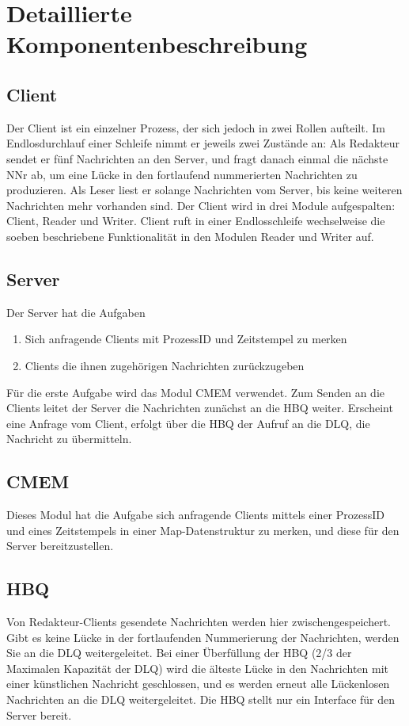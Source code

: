 \documentclass{scrreprt}
\begin{document}
\chapter{Detaillierte Komponentenbeschreibung}

\section{Client}
Der Client ist ein einzelner Prozess, der sich jedoch in zwei Rollen aufteilt. Im Endlosdurchlauf einer Schleife nimmt er jeweils zwei Zustände an: 
    Als Redakteur sendet er fünf Nachrichten an den Server, und fragt danach einmal die nächste NNr ab, um eine Lücke in den fortlaufend nummerierten Nachrichten zu produzieren.
    Als Leser liest er solange Nachrichten vom Server, bis keine weiteren Nachrichten mehr vorhanden sind.
    \newline
Der Client wird in drei Module aufgespalten: Client, Reader und Writer. Client ruft in einer Endlosschleife wechselweise die soeben beschriebene Funktionalität in den Modulen Reader und Writer auf.

\section{Server}
Der Server hat die Aufgaben  
\begin{enumerate}
    \item{Sich anfragende Clients mit ProzessID und Zeitstempel zu merken}
    \item{Clients die ihnen zugehörigen Nachrichten zurückzugeben}
\end{enumerate}
Für die erste Aufgabe wird das Modul CMEM verwendet. Zum Senden an die Clients leitet der Server die Nachrichten zunächst an die HBQ weiter. Erscheint eine Anfrage vom Client, erfolgt über die HBQ der Aufruf an die DLQ, die Nachricht zu übermitteln.

\section{CMEM}
Dieses Modul hat die Aufgabe sich anfragende Clients mittels einer ProzessID und eines Zeitstempels in einer Map-Datenstruktur zu merken, und diese für den Server bereitzustellen.

\section{HBQ}
Von Redakteur-Clients gesendete Nachrichten werden hier zwischengespeichert. Gibt es keine Lücke in der fortlaufenden Nummerierung der Nachrichten, werden Sie an die DLQ weitergeleitet. Bei einer Überfüllung der HBQ (2/3 der Maximalen Kapazität der DLQ) wird die älteste Lücke in den Nachrichten mit einer künstlichen Nachricht geschlossen, und es werden erneut alle Lückenlosen Nachrichten an die DLQ weitergeleitet. Die HBQ stellt nur ein Interface für den Server bereit.
\end{document}
